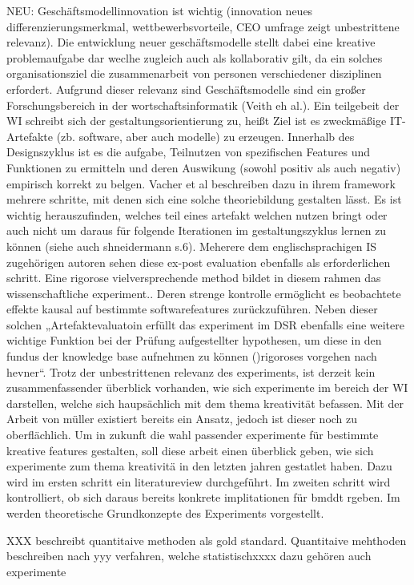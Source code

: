 NEU: Geschäftsmodellinnovation ist wichtig (innovation neues differenzierungsmerkmal, wettbewerbsvorteile, CEO umfrage zeigt unbestrittene relevanz).  Die entwicklung neuer geschäftsmodelle stellt dabei eine kreative problemaufgabe dar weclhe zugleich auch als kollaborativ gilt, da ein solches organisationsziel die zusammenarbeit von personen verschiedener disziplinen erfordert. Aufgrund dieser relevanz sind Geschäftsmodelle sind ein großer Forschungsbereich in der wortschaftsinformatik (Veith eh al.). Ein teilgebeit der WI schreibt sich der gestaltungsorientierung zu, heißt Ziel ist es zweckmäßige IT-Artefakte (zb. software, aber auch modelle) zu erzeugen. Innerhalb des Designszyklus ist es die aufgabe, Teilnutzen von spezifischen Features und Funktionen zu ermitteln und deren Auswikung (sowohl positiv als auch negativ) empirisch korrekt zu belgen. Vacher et al beschreiben dazu in ihrem framework mehrere schritte, mit denen sich eine solche theoriebildung gestalten lässt. Es ist wichtig herauszufinden, welches teil eines artefakt welchen nutzen bringt oder auch nicht um daraus für folgende Iterationen im gestaltungszyklus lernen zu können (siehe auch shneidermann s.6). Meherere dem englischsprachigen IS zugehörigen autoren sehen diese ex-post evaluation ebenfalls als erforderlichen schritt. Eine rigorose vielversprechende method bildet in diesem rahmen das wissenschaftliche experiment.. Deren strenge kontrolle ermöglicht es beobachtete effekte kausal auf bestimmte softwarefeatures zurückzuführen.
Neben dieser solchen „Artefaktevaluatoin erfüllt das experiment im DSR ebenfalls eine weitere wichtige Funktion bei der Prüfung aufgestellter hypothesen, um diese in den fundus der knowledge base aufnehmen zu können ()rigoroses vorgehen nach hevner“.
Trotz der unbestrittenen relevanz des experiments, ist derzeit kein zusammenfassender überblick vorhanden, wie sich experimente im bereich der WI darstellen, welche sich haupsächlich mit dem thema kreativität befassen. Mit der Arbeit von müller existiert bereits ein Ansatz, jedoch ist dieser noch zu oberflächlich.
Um in zukunft die wahl passender experimente für bestimmte kreative features gestalten, soll diese arbeit einen überblick geben, wie sich experimente zum thema kreativitä in den letzten jahren gestatlet haben. Dazu wird im ersten schritt ein literatureview durchgeführt. Im zweiten schritt wird kontrolliert, ob sich daraus bereits konkrete implitationen für bmddt rgeben. Im werden theoretische Grundkonzepte des Experiments vorgestellt.

XXX beschreibt quantitaive methoden als gold standard. Quantitaive mehthoden beschreiben nach yyy verfahren, welche statistischxxxx dazu gehören auch experimente


